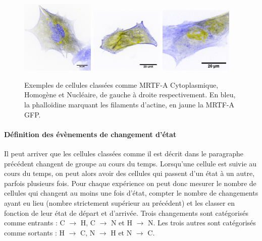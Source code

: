 \documentclass{report}
\begin{document}
 \begin{figure}
  \includegraphics[width=3.5cm]{Figures/Exemple_C_invert.png} 
 \includegraphics[width=3.5cm]{Figures/Exemple_H_invert.png} 
 \includegraphics[width=3.5cm]{Figures/Exemple_N_2_invert.png} 
 \caption{Exemples de cellules classées comme MRTF-A Cytoplasmique, Homogène et Nucléaire, de gauche à droite respectivement. En bleu, la phalloïdine marquant les filaments d'actine, en jaune la MRTF-A GFP.\label{Exemples_CHN}}

 \end{figure}
 
 \paragraph{Définition des évènements de changement d'état}
 
 Il peut arriver que les cellules classées comme il est décrit dans le paragraphe précédent changent de groupe au cours du temps. 
 Lorsqu'une cellule est suivie au cours du temps, on peut alors avoir des cellules qui passent d'un état à un autre, parfois plusieurs fois. 
 Pour chaque expérience on peut donc mesurer le nombre de cellules qui changent au moins une fois d'état, compter le nombre de changements ayant eu lieu (nombre strictement supérieur au précédent) et les classer en fonction de leur état de départ et d'arrivée. 
 Trois changements sont catégorisés comme \og entrants \fg : C $\rightarrow$ H, C $\rightarrow$ N et H $\rightarrow$ N. 
 Les trois autres sont catégorisés comme \og sortants \fg  : H $\rightarrow$ C, N $\rightarrow$ H et N $\rightarrow$ C. 
 
\end{document}
